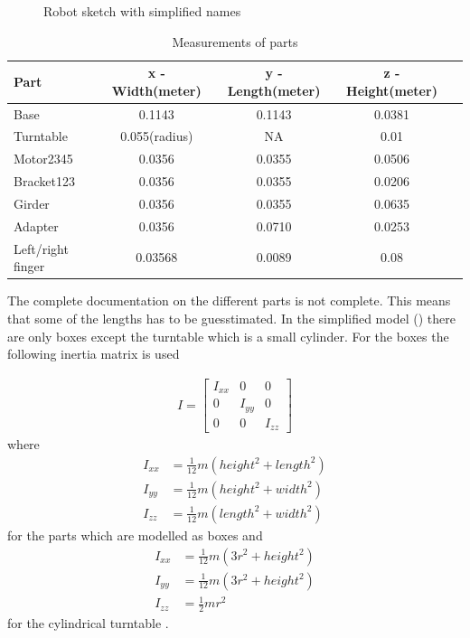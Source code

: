 \begin{figure}[htbp]
  \centering
  
  \caption{Robot sketch with simplified names}
  \label{fig:naming}
\end{figure}

\begin{table}[htbp]
\centering
\caption{Measurements of parts}
\label{table:measurements}
    \begin{tabular}{l c c c r}
        \toprule
        Part  &  x - Width(meter) & y - Length(meter) & z - Height(meter)\\
        \midrule
        Base & 0.1143 & 0.1143 & 0.0381\\
        Turntable & 0.055(radius) & NA & 0.01\\
        Motor2345 & 0.0356 & 0.0355 & 0.0506 \\
        Bracket123 & 0.0356 & 0.0355 & 0.0206 \\
        Girder & 0.0356 & 0.0355 & 0.0635\\
        Adapter & 0.0356 & 0.0710 & 0.0253\\
        Left/right finger & 0.03568 & 0.0089 & 0.08\\
        \bottomrule
    \end{tabular}
\end{table}


The complete documentation on the different parts is not complete. This means that some of the lengths has to be guesstimated\cite{Crustcrawler}. In the simplified model () there are only boxes except the turntable which is a small cylinder. For the boxes the following inertia matrix is used

\begin{align*}
    I = 
    \begin{bmatrix}
        I_{xx} & 0 & 0\\
        0 & I_{yy} & 0\\
        0 & 0 & I_{zz}
    \end{bmatrix}
\end{align*}
where
\begin{align*}
    I_{xx} &= \frac{1}{12}m(height^2+length^2)\\
    I_{yy} &= \frac{1}{12}m(height^2+width^2)\\
    I_{zz} &= \frac{1}{12}m(length^2+width^2)
\end{align*}
for the parts which are modelled as boxes and 
\begin{align*}
    I_{xx} &= \frac{1}{12}m(3r^2+height^2)\\
    I_{yy} &= \frac{1}{12}m(3r^2+height^2)\\
    I_{zz} &= \frac{1}{2}mr^2
\end{align*}
for the cylindrical turntable \cite{Dupac}. 

